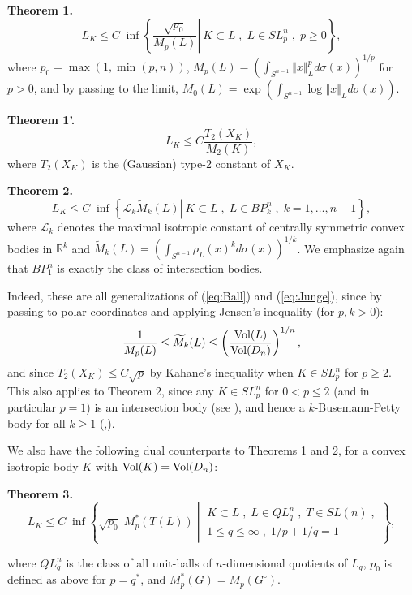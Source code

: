 \documentclass[12pt,oneside]{amsart}
\theoremstyle{definition}
\theoremstyle{remark}
\theoremstyle{proof}
\numberwithin{equation}{section}
\newcommand{\norm}[1]{\left\Vert#1\right\Vert}
\newcommand{\set}[1]{\left\{#1\right\}}
\newcommand{\brac}[1]{\left(#1\right)}
\newcommand{\Real}{\mathbb{R}}
\newcommand{\BP}{BP}
\renewcommand{\MR}{\widetilde{M}} %
\newcommand{\Lk}{\mathcal{L}_k}
\newcommand{\Vol}[1]{\textnormal{Vol} (#1)}
\newcommand{\VolRatio}[2]{\brac{\frac{\Vol{#1}}{\Vol{#2}}}^{1/n}}
\begin{document}
\smallskip
\noindent\textbf{Theorem 1.}
\[
L_K \leq C \; \inf \set{ \left . \frac{\sqrt{p_0}}{M_p(L)} \right
| \: K \subset L \; , \; L \in SL_p^n \; , \; p\geq 0},
\]
where $p_0 = \max(1,\min(p,n))$, $M_p(L) = \brac{\int_{S^{n-1}}
\norm{x}^p_L d\sigma(x)}^{1/p}$ for \mbox{$p>0$}, and by passing
to the limit, $M_0(L) = \exp \brac{\int_{S^{n-1}} \log \norm{x}_L
d\sigma(x)}$.

\smallskip
\noindent\textbf{Theorem 1'.}
\[
L_K \leq C \frac{T_2(X_K)}{M_2(K)},
\]
where $T_2(X_K)$ is the (Gaussian) type-2 constant of $X_K$.

\smallskip
\noindent\textbf{Theorem 2.}
\[
L_K \leq C \; \inf \set{ \left . \Lk \MR_k(L) \right | \: K
\subset L \; , \; L \in \BP_k^n \; , \; k = 1,\ldots,n-1 },
\]
where $\mathcal{L}_k$ denotes the maximal isotropic constant of
centrally symmetric convex bodies in $\Real^k$ and $\MR_k(L) =
\brac{\int_{S^{n-1}} \rho_L(x)^k d\sigma(x)}^{1/k}$. We emphasize
again that $\BP_1^n$ is exactly the class of intersection bodies.

\medskip \noindent Indeed, these are all generalizations of
(\ref{eq:Ball}) and (\ref{eq:Junge}), since by passing to polar
coordinates and applying Jensen's inequality (for $p,k>0$):
\begin{equation} \label{eq:Jensen}
\frac{1}{M_p(L)} \leq \MR_k(L) \leq \VolRatio{L}{D_n},
\end{equation}
and since $T_2(X_K) \leq C \sqrt{p}$ by Kahane's inequality when
$K \in SL_p^n$ for $p \geq 2$. This also applies to Theorem 2,
since any $K \in SL^n_p$ for $0<p\leq 2$ (and in particular
$p=1$) is an intersection body (see
\cite{Koldobsky-intersection-bodies}), and hence a
$k$-Busemann-Petty body for all $k\geq 1$
(\cite{Grinberg-Zhang},\cite{EMilman-Generalized-Intersection-Bodies}).

\medskip

We also have the following dual counterparts to Theorems 1 and 2,
for a convex isotropic body $K$ with $\Vol{K} = \Vol{D_n}$:

\smallskip
\noindent\textbf{Theorem 3.}
\smallskip
\[
L_K \leq C \; \inf \set{ \sqrt{p_0} \; M^*_p(T(L)) \; \left | \:
\begin{array}{c} K \subset L \; , \; L \in QL_q^n \; , \; T \in
SL(n) \; , \\  1\leq q\leq\infty \; , \; 1/p + 1/q = 1
\end{array} \right . },
\]

\noindent where $QL_q^n$ is the class of all unit-balls of
$n$-dimensional quotients of $L_q$, $p_0$ is defined as above for
$p = q^*$, and $M^*_p(G) = M_p(G^\circ)$.
\end{document}
